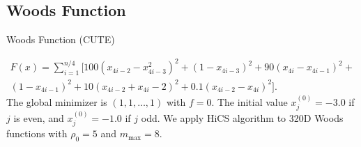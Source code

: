 \documentclass{beamer}
\begin{document}
\subsection{Woods Function}
\begin{frame}{Woods Function (CUTE)}

\footnotesize{
\begin{equation*}
	\begin{aligned}
		F(x) = \sum^{n/4}_{i=1} \Big[100(x_{4i-2}-x^2_{4i-3})^2 +
		(1-x_{4i-3})^2 + 90(x_{4i}-x_{4i-1})^2 +
		\\
		(1-x_{4i-1})^2 + 10(x_{4i-2}+x_{4i}-2)^2 +
		0.1(x_{4i-2}-x_{4i})^2
		\Big].
	\end{aligned}
\end{equation*}
}
\footnotesize{
\noindent The global minimizer is $(1,1,\dots,1)$ with $f=0$.
The initial value $x_j^{(0)}=-3.0$ if
$j$ is even, and  $x_j^{(0)}=-1.0$ if $j$ odd.
We apply HiCS algorithm to 320D Woods functions with
$\rho_0 = 5$ and $m_{\max}=8$.
}
%
\begin{figure}[!htbp]
	\centering

\end{figure}
\end{frame}
\end{document}
